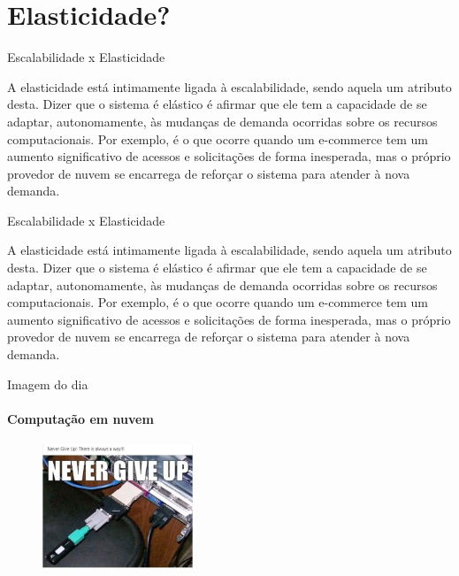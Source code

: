 \documentclass{beamer}
\begin{document}
\section{Elasticidade?}

            \begin{frame}{Escalabilidade x Elasticidade} \justifying

                A elasticidade está intimamente ligada à escalabilidade, sendo aquela um atributo desta. Dizer que o sistema é elástico é afirmar que ele tem a capacidade de se adaptar, autonomamente, às mudanças de demanda ocorridas sobre os recursos computacionais. Por exemplo, é o que ocorre quando um e-commerce tem um aumento significativo de acessos e solicitações de forma inesperada, mas o próprio provedor de nuvem se encarrega de reforçar o sistema para atender à nova demanda.
                
                \end{frame}
            
                \begin{frame}{Escalabilidade x Elasticidade} \justifying

                    
                    A elasticidade está intimamente ligada à escalabilidade, sendo aquela um atributo desta. Dizer que o sistema é elástico é afirmar que ele tem a capacidade de se adaptar, autonomamente, às mudanças de demanda ocorridas sobre os recursos computacionais. Por exemplo, é o que ocorre quando um e-commerce tem um aumento significativo de acessos e solicitações de forma inesperada, mas o próprio provedor de nuvem se encarrega de reforçar o sistema para atender à nova demanda.
                    
                    \end{frame}
                

\begin{frame}[fragile]{Imagem do dia}
	\framesubtitle{Computação em nuvem}
	\begin{figure}[H]
		\centerline{\includegraphics[width=0.4\textwidth]{assets/imagem-do-dia/FxXf1BeWYAACU1r.jpeg}}

	\end{figure}
\end{frame}
\footlinecolor{}

\backmatter
\end{document}
